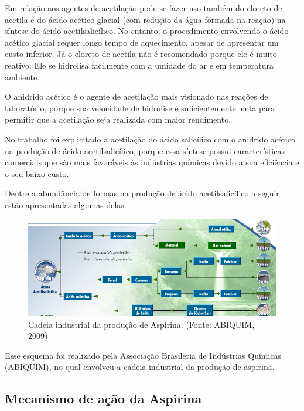 Em relação aos agentes de acetilação pode-se fazer uso também do cloreto de acetila e do ácido
acético glacial (com redução da água formada na reação) na síntese do ácido acetilsalicílico.  No
entanto, o procedimento envolvendo o ácido acético glacial requer longo tempo de aquecimento, apesar
de apresentar um custo inferior. Já o cloreto de acetila não é recomendado porque ele é muito
reativo. Ele se hidrolisa facilmente com a umidade do ar e em temperatura ambiente.

O anidrido acético é o agente de acetilação mais visionado nas reações de laboratório, porque sua
velocidade de hidrólise é suficientemente lenta para permitir que a acetilação seja realizada com
maior rendimento.~\cite{PERUCH2013}

No trabalho foi explicitado a acetilação do ácido salicílico com o anidrido acético na produção de
ácido acetilsalicílico, porque essa síntese possui características comerciais que são mais
favoráveis às indústrias químicas devido a sua eficiência e o seu baixo custo. 

Dentre a abundância de formas na produção de ácido acetilsalicílico a seguir estão apresentadas
algumas delas.

\begin{figure}[H]
\begin{center}
    \includegraphics[scale=0.83]{figuras/abiquim.png}
\end{center}
\caption{Cadeia industrial da produção de Aspirina\R. (Fonte: ABIQUIM, 2009)}
\label{fig:abiquim}
\end{figure}

Esse esquema foi realizado pela  Associação Brasileria de Indústrias Químicas (ABIQUIM), no qual
envolveu a cadeia industrial da produção de aspirina.~\cite{abiquim}

\subsection{Mecanismo de ação da Aspirina}

